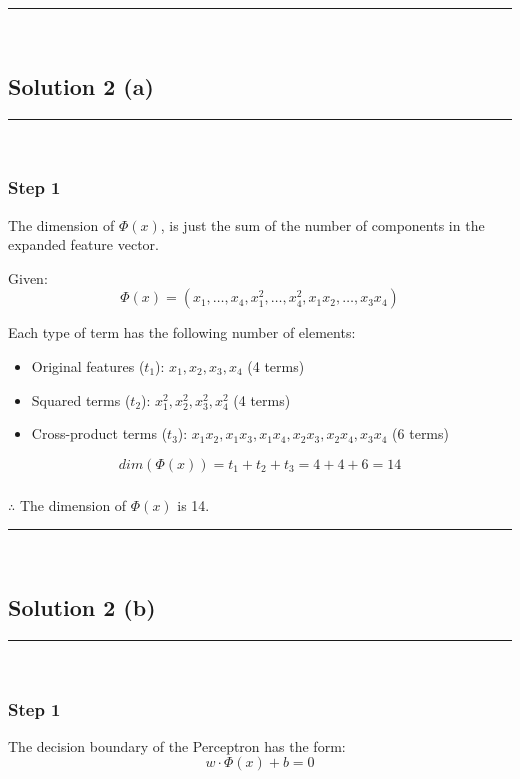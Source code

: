 \documentclass{article}
\begin{document}
\noindent\rule{\textwidth}{0.4pt}\\

\newpage

\subsection*{Solution 2 (a)}
\noindent\rule{\textwidth}{0.4pt}\\

\subsubsection*{Step 1}
\parbox{\textwidth}{
The dimension of $\Phi(x)$, is just the sum of the number of components in the expanded feature vector.

Given:
$$\Phi(x) = \left(x_{1}, \ldots, x_{4}, x_{1}^{2}, \ldots, x_{4}^{2}, x_{1} x_{2}, \ldots, x_{3} x_{4}\right)$$

Each type of term has the following number of elements:
\begin{itemize}
    \item Original features ($t_1$): $x_1, x_2, x_3, x_4$ (4 terms)
    \item Squared terms ($t_2$): $x_1^2, x_2^2, x_3^2, x_4^2$ (4 terms)
    \item Cross-product terms ($t_3$): $x_1x_2, x_1x_3, x_1x_4, x_2x_3, x_2x_4, x_3x_4$ (6 terms)
\end{itemize}

$$dim(\Phi(x)) = t_1 + t_2 + t_3 = 4 + 4 + 6 = 14 $$
}

\subsubsection*{\normalfont}{$\therefore$ The dimension of $\Phi(x)$ is 14.}

\noindent\rule{\textwidth}{0.4pt}\\

\newpage

\subsection*{Solution 2 (b)}
\noindent\rule{\textwidth}{0.4pt}\\

\subsubsection*{Step 1}
\parbox{\textwidth}{
The decision boundary of the Perceptron has the form:
$$w \cdot \Phi(x) + b = 0$$


}
\end{document}
